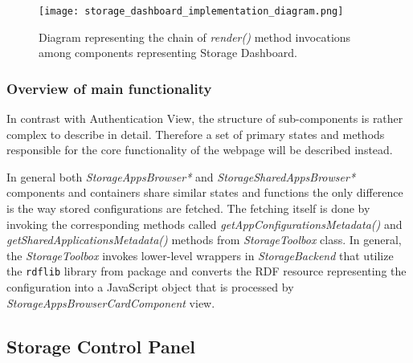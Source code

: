 \begin{figure}[h]
\centering
\texttt{[image: storage\_dashboard\_implementation\_diagram.png]}
\caption{Diagram representing the chain of \textit{render()} method invocations among components representing Storage Dashboard.}
\label{fig:storage_dashboard_implementation_diagram}
\end{figure}

\subsubsection{Overview of main functionality}

In contrast with Authentication View, the structure of sub-components is rather complex to describe in detail. Therefore a set of primary states and methods responsible for the core functionality of the webpage will be described instead.

In general both \textit{StorageAppsBrowser*} and \textit{StorageSharedAppsBrowser*} components and containers share similar states and functions the only difference is the way stored \lpa{} configurations are fetched. The fetching itself is done by invoking the corresponding methods called \textit{getAppConfigurationsMetadata()} and \textit{getSharedApplicationsMetadata()} methods from \textit{StorageToolbox} class. In general, the \textit{StorageToolbox} invokes lower-level wrappers in \textit{StorageBackend} that utilize the \texttt{rdflib} library from \lpas{} package and converts the RDF resource representing the \lpa{} configuration into a JavaScript object that is processed by \textit{StorageAppsBrowserCardComponent} view.

\subsection{Storage Control Panel}
\label{sssec:storage_control_panel_implementation}

